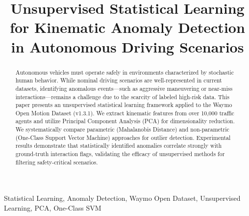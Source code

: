 \documentclass[conference]{IEEEtran}
\begin{document}
\title{Unsupervised Statistical Learning for Kinematic Anomaly Detection in Autonomous Driving Scenarios}

\author{
\and
{}
\and
{}
}

\maketitle

\begin{abstract}
Autonomous vehicles must operate safely in environments characterized by stochastic human behavior. While nominal driving scenarios are well-represented in current datasets, identifying anomalous events---such as aggressive maneuvering or near-miss interactions---remains a challenge due to the scarcity of labeled high-risk data. This paper presents an unsupervised statistical learning framework applied to the Waymo Open Motion Dataset (v1.3.1). We extract kinematic features from over 10,000 traffic agents and utilize Principal Component Analysis (PCA) for dimensionality reduction. We systematically compare parametric (Mahalanobis Distance) and non-parametric (One-Class Support Vector Machine) approaches for outlier detection. Experimental results demonstrate that statistically identified anomalies correlate strongly with ground-truth interaction flags, validating the efficacy of unsupervised methods for filtering safety-critical scenarios.
\end{abstract}

\begin{IEEEkeywords}
Statistical Learning, Anomaly Detection, Waymo Open Dataset, Unsupervised Learning, PCA, One-Class SVM
\end{IEEEkeywords}
\end{document}
